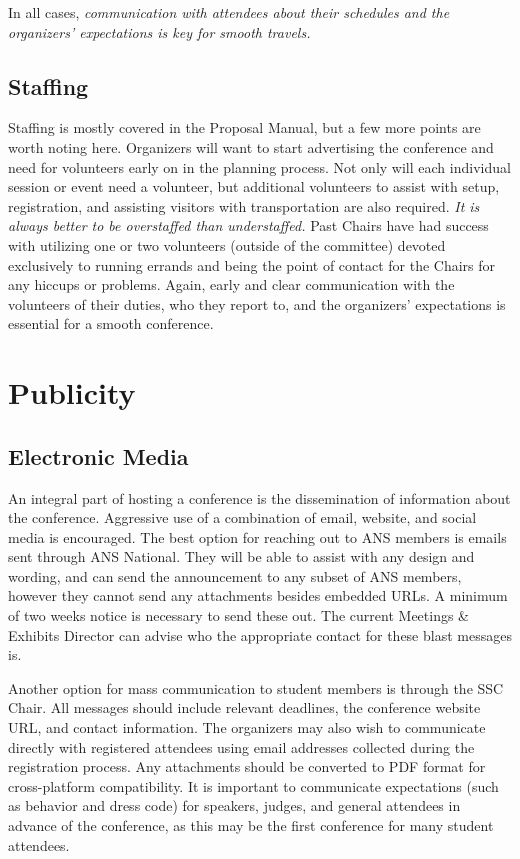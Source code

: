 \documentclass[12pt]{article}
\begin{document}
In all cases, \emph{communication with attendees about their schedules and the organizers' expectations is key for smooth travels.}

\subsection{Staffing}
Staffing is mostly covered in the Proposal Manual, but a few more points are worth noting here.
Organizers will want to start advertising the conference and need for volunteers early on in the planning process.
Not only will each individual session or event need a volunteer, but additional volunteers to assist with setup, registration, and assisting visitors with transportation are also required.
\emph{It is always better to be overstaffed than understaffed.}
Past Chairs have had success with utilizing one or two volunteers (outside of the committee) devoted exclusively to running errands and being the point of contact for the Chairs for any hiccups or problems.
Again, early and clear communication with the volunteers of their duties, who they report to, and the organizers' expectations is essential for a smooth conference.

\clearpage
\section{Publicity}
\subsection{Electronic Media}
An integral part of hosting a conference is the dissemination of information about the conference.
Aggressive use of a combination of email, website, and social media is encouraged.
The best option for reaching out to ANS members is emails sent through ANS National.
They will be able to assist with any design and wording, and can send the announcement to any subset of ANS members, however they cannot send any attachments besides embedded URLs.
A minimum of two weeks notice is necessary to send these out.
The current Meetings \& Exhibits Director can advise who the appropriate contact for these blast messages is.

Another option for mass communication to student members is through the SSC Chair. 
All messages should include relevant deadlines, the conference website URL, and contact information.
The organizers may also wish to communicate directly with registered attendees using email addresses collected during the registration process.
Any attachments should be converted to PDF format for cross-platform compatibility.
It is important to communicate expectations (such as behavior and dress code) for speakers, judges, and general attendees in advance of the conference, as this may be the first conference for many student attendees.
\end{document}
